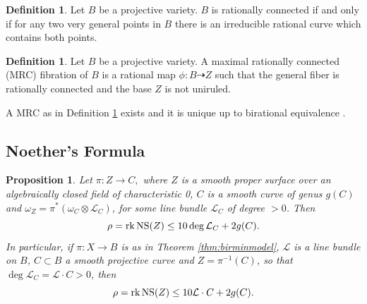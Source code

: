 \documentclass[11pt]{amsart}
\newtheorem{proposition}[theorem]{Proposition}
\theoremstyle{definition}
\newtheorem{definition}[theorem]{Definition}
\theoremstyle{definition}
\theoremstyle{remark}
\theoremstyle{remark}
\theoremstyle{definition}
\theoremstyle{conjecture}
\begin{document}
\begin{definition}\label{def:RC} Let $B$ be a projective variety. $B$ is rationally connected if and only if  for  any two  very general points in $B$ there is an irreducible rational curve which contains both points.
\end{definition}

\begin{definition}\label{def:MRC} Let $B$ be a projective variety. A maximal rationally connected (MRC) fibration of $B$ is a rational map
$\phi : B \dashrightarrow Z$
such that the general fiber is rationally connected and the base $Z$ is not uniruled.
\end{definition}

 A MRC as in Definition \ref{def:MRC} exists and it is unique up to birational equivalence \cite{Campana1992,KollarMiyaokaMori1992}.

  
\color{black}
\medskip
\subsection{Noether's Formula}

\begin{proposition}\label{prop:Noether} Let
$
\pi \colon Z \to C,
$
where  $Z$ is a smooth  proper surface
over an algebraically closed field of characteristic 0,
$C$ is a smooth curve of genus $g(C)$ and $\omega_Z= \pi^*(\omega_C
\otimes  \mathcal{L}_C)$, for some line bundle $\mathcal{L}_C$
of degree $>0$.
Then
   \begin{equation}\label{rhoform}
\rho = \mathrm{rk}\, {\rm NS}(Z)\le 10   \deg {\mathcal L}_C+2g(C).
\end{equation}
In particular, if
$\pi: X \to B$ is as in Theorem \ref{thm:birminmodel},
$\mathcal{L}$  is  a line  bundle on $B$,  $C \subset B$ a smooth projective
curve  and
$Z=\pi^{-1}(C)$, so that
$\deg \mathcal{L}_C=\mathcal{L} \cdot C>0$, then
 \begin{equation}
\rho = \mathrm{rk}\, {\rm NS}(Z)\le 10  \mathcal{L} \cdot C+2g(C).
\end{equation}

\end{proposition}
 
\end{document}
